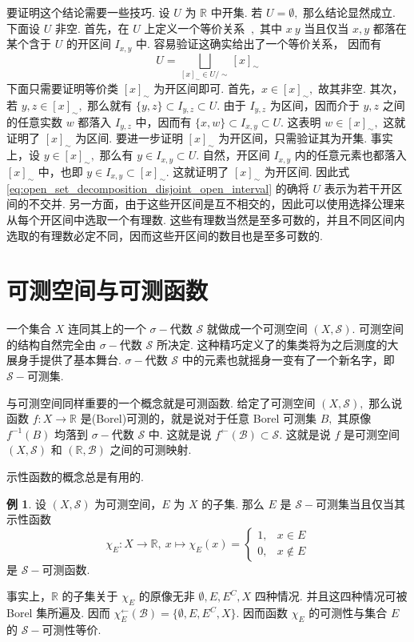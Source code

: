 \documentclass[12pt, a4paper, oneside]{book}
\numberwithin{figure}{section}
\theoremstyle{definition}
\newtheorem{example}[theorem]{例}
\begin{document}
要证明这个结论需要一些技巧. 设 $U$ 为 $\mathbb R$ 中开集. 若 $U=\emptyset,$ 那么结论显然成立. 下面设 $U$ 非空. 首先，在 $U$ 上定义一个等价关系 $~,$ 其中 $x~y$ 当且仅当 $x,y$ 都落在某个含于 $U$ 的开区间 $I_{x,y}$ 中. 容易验证这确实给出了一个等价关系，
因而有
\begin{equation}\label{eq:open_set_decomposition_disjoint_open_interval}
    U=\bigsqcup_{[x]_\sim\in U/\sim} [x]_\sim
\end{equation}
下面只需要证明等价类 $[x]_\sim$ 为开区间即可. 首先，$x\in [x]_\sim,$ 故其非空. 其次，若 $y,z\in [x]_\sim,$ 那么就有 $\{y,z\}\subset I_{y,z}\subset U.$ 由于 $I_{y,z}$ 为区间，因而介于 $y,z$ 之间的任意实数 $w$ 都落入 $I_{y,z}$ 中，因而有 $\{x,w\}\subset I_{x,y}\subset U.$ 
这表明 $w\in [x]_\sim,$ 这就证明了 $[x]_\sim$ 为区间. 要进一步证明 $[x]_\sim$ 为开区间，只需验证其为开集. 事实上，设 $y\in [x]_\sim,$ 那么有 $y\in I_{x,y}\subset U.$ 自然，开区间 $I_{x,y}$ 内的任意元素也都落入 $[x]_\sim$ 中，也即 $y\in I_{x,y}\subset [x]_\sim.$ 
这就证明了 $[x]_\sim$ 为开区间. 因此式 \eqref{eq:open_set_decomposition_disjoint_open_interval} 的确将 $U$ 表示为若干开区间的不交并. 
另一方面，由于这些开区间是互不相交的，因此可以使用选择公理来从每个开区间中选取一个有理数.  这些有理数当然是至多可数的，并且不同区间内选取的有理数必定不同，因而这些开区间的数目也是至多可数的. 


\section{可测空间与可测函数}


一个集合 $X$ 连同其上的一个 $\sigma-$代数 $\mathcal S$ 就做成一个可测空间 $(X,\mathcal S).$ 可测空间的结构自然完全由 $\sigma-$代数 $\mathcal S$ 所决定. 这种精巧定义了的集类将为之后测度的大展身手提供了基本舞台. 
$\sigma-$代数 $\mathcal S$ 中的元素也就摇身一变有了一个新名字，即 $\mathcal S-$可测集.


与可测空间同样重要的一个概念就是可测函数. 给定了可测空间 $(X,\mathcal S),$ 那么说函数 $f:X\to \mathbb R$ 是(Borel)可测的，就是说对于任意 Borel 可测集 $B,$ 其原像 $f^{-1}(B)$ 均落到 $\sigma-$代数 $\mathcal S$ 中. 
这就是说 $f^{\leftarrow}(\mathcal B)\subset\mathcal S.$ 这就是说 $f$ 是可测空间 $(X,\mathcal S)$ 和 $(\mathbb R,\mathcal B)$ 之间的可测映射.

示性函数的概念总是有用的.

\begin{example}\label{ex:indicator_function__measurability}
    设 $(X,\mathcal S)$ 为可测空间，$E$ 为 $X$ 的子集. 那么 $E$ 是 $\mathcal S-$可测集当且仅当其示性函数
    \begin{equation}
        \chi_E:X\to\mathbb R,\ x\mapsto\chi_E(x)=\begin{cases}
            1,&x\in E\\
            0,&x\notin E
        \end{cases}
    \end{equation}
    是 $\mathcal S-$可测函数.
\end{example}
事实上，$\mathbb R$ 的子集关于 $\chi_E$ 的原像无非 $\emptyset,E,E^C,X$ 四种情况. 并且这四种情况可被 Borel 集所遍及. 
因而 $\chi_E^\leftarrow(\mathcal B)=\{\emptyset,E,E^C,X\}.$ 因而函数 $\chi_E$ 的可测性与集合 $E$ 的 $\mathcal S-$可测性等价.
\end{document}
